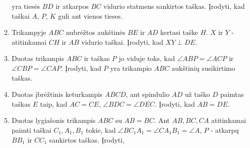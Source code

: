 \begin{enumerate}
    yra tiesės $BD$ ir atkarpos $BC$ vidurio statmens
    sankirtos taškas. Įrodyti, kad taškai $A$, $P$, $K$ guli
    ant vienos tieses.
  \item Trikampyje $ABC$ nubrėžtos aukštinės $BE$ ir $AD$
    kertasi taške $H$. $X$ ir $Y$ - atitinkamai $CH$ ir $AB$
    vidurio taškai. Įrodyti, kad $XY\perp{DE}$.
  \item Duotas trikampis $ABC$ ir taškas $P$ jo viduje toks,
    kad $\angle ABP = \angle ACP$ ir $\angle CBP = \angle
    CAP$.  Įrodyti, kad $P$ yra trikampio $ABC$ aukštinių
    susikirtimo taškas.
  \item Duotas įbrėžtinis keturkampis $ABCD$, ant spindulio
    $AD$ už taško $D$ paimtas taškas $E$ taip, kad $AC=CE$,
    $\angle BDC=\angle DEC$. Įrodyti, kad $AB=DE$. 
  \item Duotas lygiašonis trikampis $ABC$ su $AB = BC$. Ant
    $AB, BC, CA$ atitinkamai paimti taškai $C_1, A_1, B_1$
    tokie, kad $\angle BC_1A_1 = \angle CA_1B_1 = \angle A$,
    $P$ - atkarpų $BB_1$ ir $CC_1$ sankirtos taškas. Įrodyti,

\end{enumerate}
